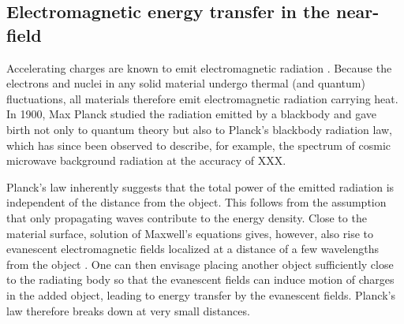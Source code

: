 






\subsection{Electromagnetic energy transfer in the near-field}
\label{sec:intro_em}
Accelerating charges are known to emit electromagnetic radiation \cite{}. Because the electrons and nuclei in any solid material undergo thermal (and quantum) fluctuations, all materials therefore emit electromagnetic radiation carrying heat. In 1900, Max Planck \cite{planck00a} studied the radiation emitted by a blackbody and gave birth not only to quantum theory but also to Planck's blackbody radiation law, which has since been observed to describe, for example, the spectrum of cosmic microwave background radiation at the accuracy of XXX.

Planck's law inherently suggests that the total power of the emitted radiation is independent of the distance from the object. This follows from the assumption that only propagating waves contribute to the energy density. Close to the material surface, solution of Maxwell's equations gives, however, also rise to evanescent electromagnetic fields localized at a distance of a few wavelengths from the object \cite{polder71}. One can then envisage placing another object sufficiently close to the radiating body so that the evanescent fields can induce motion of charges in the added object, leading to energy transfer by the evanescent fields. Planck's law therefore breaks down at very small distances. 

